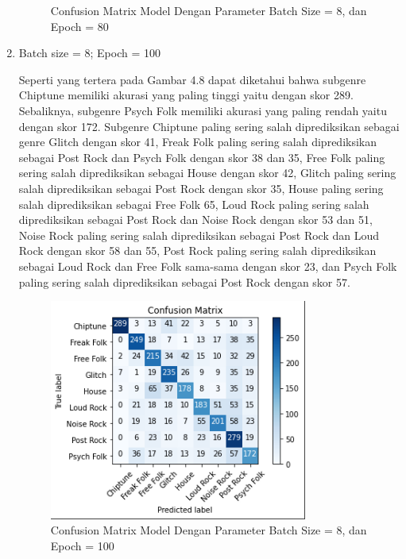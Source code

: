 \begin{enumerate}
\begin{figure}[H]
		\caption{Confusion Matrix Model Dengan Parameter Batch Size = 8, dan Epoch = 80}
		\label{fig:cm_b8_e80}
	\end{figure}
	
	\item Batch size = 8; Epoch = 100
	
	Seperti yang tertera pada Gambar 4.8 dapat diketahui bahwa subgenre Chiptune memiliki akurasi yang paling tinggi yaitu dengan skor 289. Sebaliknya, subgenre Psych Folk memiliki akurasi yang paling rendah yaitu dengan skor 172. Subgenre Chiptune paling sering salah diprediksikan sebagai genre Glitch dengan skor 41, Freak Folk paling sering salah diprediksikan sebagai Post Rock dan Psych Folk dengan skor 38 dan 35, Free Folk paling sering salah diprediksikan sebagai House dengan skor 42, Glitch paling sering salah diprediksikan sebagai Post Rock dengan skor 35, House paling sering salah diprediksikan sebagai Free Folk 65, Loud Rock paling sering salah diprediksikan sebagai Post Rock dan Noise Rock dengan skor 53 dan 51, Noise Rock paling sering salah diprediksikan sebagai Post Rock dan Loud Rock dengan skor 58 dan 55, Post Rock paling sering salah diprediksikan sebagai Loud Rock dan Free Folk sama-sama dengan skor 23, dan Psych Folk paling sering salah diprediksikan sebagai Post Rock dengan skor 57.
	
	\begin{figure}[H]
		\centering
		
		\includegraphics[width=0.8\textwidth]{gambar/confusion matrix_b8_e100}
		
		\caption{Confusion Matrix Model Dengan Parameter Batch Size = 8, dan Epoch = 100}
		\label{fig:cm_b8_e100}
	\end{figure}


\end{enumerate}
